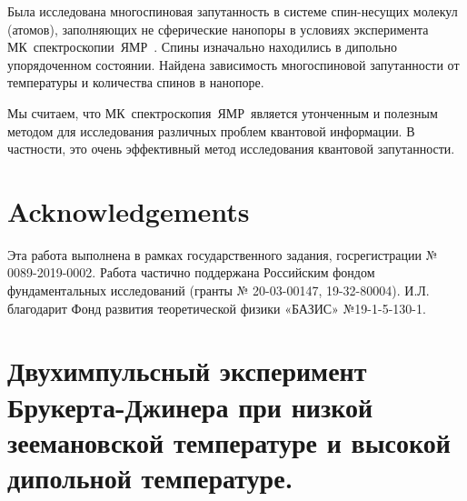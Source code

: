 \documentclass[utf8]{jetp}
\begin{document}
Была исследована многоспиновая запутанность в системе спин-несущих молекул (атомов), заполняющих не сферические нанопоры в условиях эксперимента МК~спектроскопии~ЯМР~.
Спины изначально находились в дипольно упорядоченном состоянии.
Найдена зависимость многоспиновой запутанности от температуры и количества спинов в нанопоре.

Мы считаем, что МК~спектроскопия~ЯМР~является утонченным и полезным методом для исследования различных проблем квантовой информации.
В частности, это очень эффективный метод исследования квантовой запутанности.


\section{Acknowledgements}
Эта работа выполнена в рамках государственного задания, госрегистрации № 0089-2019-0002.
Работа частично поддержана Российским фондом фундаментальных исследований (гранты № 20-03-00147, 19-32-80004).
И.Л. благодарит Фонд развития теоретической физики «БАЗИС» №19-1-5-130-1.



\appendix
\section{Двухимпульсный эксперимент Брукерта-Джинера при низкой зеемановской температуре и высокой дипольной температуре.}
\end{document}
